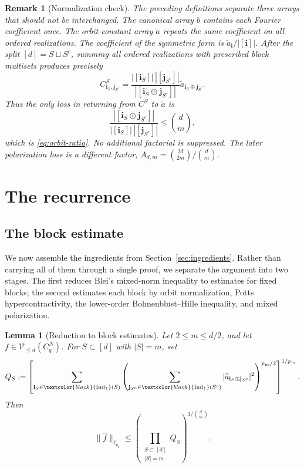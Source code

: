 \documentclass[11pt,a4paper]{article}
\numberwithin{equation}{section}
\theoremstyle{cleanplain}
\newtheorem{lemma}[lemma]{Lemma}
\theoremstyle{cleandefinition}
\theoremstyle{cleanremark}
\newtheorem{remark}[remark]{Remark}
\newcommand{\Indup}{\textcolor{black}{\operatorname{Ind}_{\uparrow}}}
\begin{document}
{\begin{remark}[Normalization check]\label{rem:normalization-audit}
The preceding definitions separate three arrays that should not be
interchanged.  The canonical array \(b\) contains each Fourier coefficient
once.  The orbit-constant array \(\widetilde a\) repeats the same coefficient
on all ordered realizations.  The coefficient of the symmetric form is
\(\widetilde a_{\mathbf i}/|[\mathbf i]|\).  After the split
\([d]=S\sqcup S^c\), summing all ordered realizations with prescribed block
multisets produces precisely
\[
 C^S_{\mathbf i_S,\mathbf j_{S^c}}
 =
 \frac{|[\mathbf i_S]|\,|[\mathbf j_{S^c}]|}
 {|[\mathbf i_S\oplus\mathbf j_{S^c}]|}
 \widetilde a_{\mathbf i_S\oplus\mathbf j_{S^c}}.
\]
Thus the only loss in returning from \(C^S\) to \(\widetilde a\) is
\[
 \frac{|[\mathbf i_S\oplus\mathbf j_{S^c}]|}
 {|[\mathbf i_S]|\,|[\mathbf j_{S^c}]|}
 \leq\binom dm,
\]
which is \eqref{eq:orbit-ratio}.  No additional factorial is suppressed.
The later polarization loss is a different factor,
\(A_{d,m}=\binom{2d}{2m}/\binom dm\).
\end{remark}

}

\section{The recurrence}\label{sec:recurrence}

\subsection{The block estimate}

We now assemble the ingredients from Section~\ref{sec:ingredients}.  Rather
than carrying all of them through a single proof, we separate the argument
into two stages.  The first reduces Blei's mixed-norm inequality to estimates for fixed blocks;
the second estimates each block by orbit normalization, Potts
hypercontractivity, the lower-order Bohnenblust--Hille inequality, and mixed
polarization.

\begin{lemma}[Reduction to block estimates]\label{lem:blei-reduction-recurrence}
Let $2\leq m\leq d/2$, and let
$f\in\mathcal V_{\leq d}(C_q^N)$.  For $S\subset[d]$ with $|S|=m$, set
\begin{equation}\label{eq:QS}
 Q_S:=
 \left[
 \sum_{\mathbf i_S\in\Indup(S)}
 \left(
 \sum_{\mathbf j_{S^c}\in\Indup(S^c)}
 |\widetilde a_{\mathbf i_S\oplus\mathbf j_{S^c}}|^2
 \right)^{p_m/2}
 \right]^{1/p_m}.
\end{equation}
Then
\begin{equation}\label{eq:blei-canonical}
 \|\widehat f\|_{\ell_{p_d}}
 \leq
 \left(
 \prod_{\substack{S\subset[d]\\ |S|=m}}Q_S
 \right)^{1/\binom dm}.
\end{equation}
\end{lemma}
\end{document}
